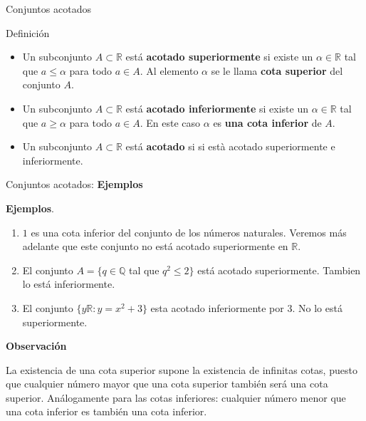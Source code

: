 \documentclass[ignorenonframetext,]{beamer}
\begin{document}
\begin{frame}{Conjuntos acotados}
\protect\hypertarget{conjuntos-acotados}{}

Definición

\begin{itemize}
\item
  Un subconjunto \(A \subset \mathbb{R}\) está \textbf{acotado
  superiormente} si existe un \(\alpha \in \mathbb{R}\) tal que
  \(a \leq \alpha\) para todo \(a \in A\). Al elemento \(\alpha\) se le
  llama \textbf{cota superior} del conjunto \(A\).
\item
  Un subconjunto \(A \subset \mathbb{R}\) está \textbf{acotado
  inferiormente} si existe un \(\alpha \in \mathbb{R}\) tal que
  \(a \geq \alpha\) para todo \(a \in A\). En este caso \(\alpha\) es
  \textbf{una cota inferior} de \(A\).
\item
  Un subconjunto \(A \subset \mathbb{R}\) está \textbf{acotado} si si
  està acotado superiormente e inferiormente.
\end{itemize}

\end{frame}

\begin{frame}{Conjuntos acotados: \textbf{Ejemplos}}
\protect\hypertarget{conjuntos-acotados-ejemplos}{}

\textbf{Ejemplos}.

\begin{enumerate}
[1)]
\item
  \(1\) es una cota inferior del conjunto de los números naturales.
  Veremos más adelante que este conjunto no está acotado superiormente
  en \(\mathbb{R}\).
\item
  El conjunto \(A =\{q \in \mathbb{Q}\) tal que \(q^2 \leq 2 \}\) está
  acotado superiormente. Tambien lo está inferiormente.
\item
  El conjunto \(\{ y \mathbb{R}: y=x^2+3\}\) esta acotado inferiormente
  por \(3\). No lo está superiormente.
\end{enumerate}

\textbf{Observación}

La existencia de una cota superior supone la existencia de infinitas
cotas, puesto que cualquier número mayor que una cota superior también
será una cota superior. Análogamente para las cotas inferiores:
cualquier número menor que una cota inferior es también una cota
inferior.

\end{frame}
\end{document}
